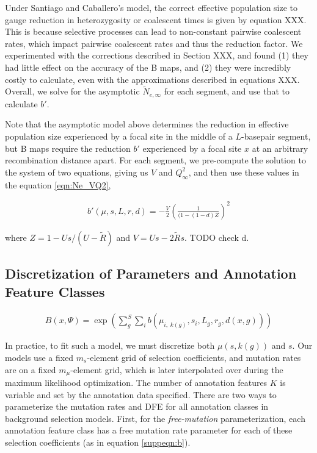 \documentclass[11pt]{article}
\begin{document}
Under Santiago and Caballero's model, the correct effective population size to
gauge reduction in heterozygosity or coalescent times is given by equation XXX.
This is because selective processes can lead to non-constant pairwise
coalescent rates, which impact pairwise coalescent rates and thus the reduction
factor. We experimented with the corrections described in Section XXX, and
found (1) they had little effect on the accuracy of the B maps, and (2) they
were incredibly costly to calculate, even with the approximations described in
equations XXX. Overall, we solve for the asymptotic $\widetilde{N}_{e,\infty}$
for each segment, and use that to calculate $b'$.

Note that the asymptotic model above determines the reduction in effective
population size experienced by a focal site in the middle of a $L$-basepair
segment, but B maps require the reduction $b'$ experienced by a focal site $x$
at an arbitrary recombination distance apart. For each segment, we pre-compute
the solution to the system of two equations, giving us $V$ and $Q_\infty^2$,
and then use these values in the equation \eqref{eqn:Ne_VQ2},

\begin{align} 
    b'(\mu, s, L, r, d) = -\frac{V}{2} \left(\frac{1}{(1-(1-d)Z}\right)^2 
\end{align}

where $Z = 1 - Us / (U-\widetilde{R})$ and $V = Us - 2\widetilde{R}s$. TODO
check d.


\subsection{Discretization of Parameters and Annotation Feature Classes}

\begin{align}
  \label{suppeqn:b}
  B(x, \Psi) = \exp \left( \sum_g^S \sum_{i} b\left( \mu_{i, \;k(g)}, s_i, L_g, r_g, d(x, g) \right)\right)
\end{align}


In practice, to fit such a model, we must discretize both $\mu(s, k(g))$ and
$s$. Our models use a fixed $m_s$-element grid of selection coefficients, and
mutation rates are on a fixed $m_\mu$-element grid, which is later interpolated
over during the maximum likelihood optimization. The number of annotation
features $K$ is variable and set by the annotation data specified. There are
two ways to parameterize the mutation rates and DFE for all annotation classes
in background selection models. First, for the \emph{free-mutation}
parameterization, each annotation feature class has a free mutation rate
parameter for each of these selection coefficients (as in equation
\eqref{suppeqn:b}).
\end{document}
